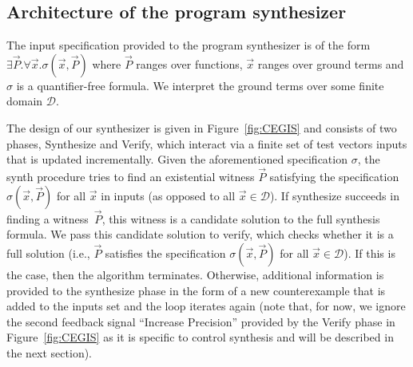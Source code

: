 \documentclass[final]{sig-alternate-05-2015}
\newcommand{\red}[1]{{\color{red}#1}}
\begin{document}


\subsection{Architecture of the program synthesizer}
\label{synthesizer-general}
%
% 
The input specification provided to the program synthesizer is of the form
$\exists \vec{P} .  \forall \vec{x}.  \sigma(\vec{x}, \vec{P})$ where
$\vec{P}$ ranges over functions, $\vec{x}$ ranges over ground terms and
$\sigma$ is a quantifier-free formula.  We interpret the ground terms over
some finite domain $\mathcal{D}$.

The design of our synthesizer is given in Figure~\ref{fig:CEGIS} and consists
of two phases, {\sc Synthesize} and {\sc Verify}, which interact via a
finite set of test vectors {\sc inputs} that is updated incrementally. 
Given the aforementioned specification $\sigma$, the {\sc synth} procedure
tries to find an existential witness $\vec{P}$ satisfying the specification
$\sigma(\vec{x}, \vec{P})$ for all $\vec{x}$ in {\sc inputs} (as opposed to
all $\vec{x} \in \mathcal{D}$).
%
If {\sc synthesize} succeeds in finding a witness~$\vec{P}$, this witness
is a candidate solution to the full synthesis formula.  We pass this
candidate solution to {\sc verify}, which checks whether it is a full
solution (i.e., $\vec{P}$ satisfies the specification $\sigma(\vec{x},
\vec{P})$ for all $\vec{x}\in\mathcal{D}$).
%
%
%
If this is the case, then the algorithm terminates.  Otherwise, additional
information is provided to the {\sc synthesize} phase in the form of a new
counterexample that is added to the {\sc inputs} set and the loop iterates
again (note that, for now, we ignore the second feedback signal ``Increase
Precision'' provided by the {\sc Verify} phase in Figure~\ref{fig:CEGIS} as it
is specific to control synthesis and will be described in the next section).
\end{document}
